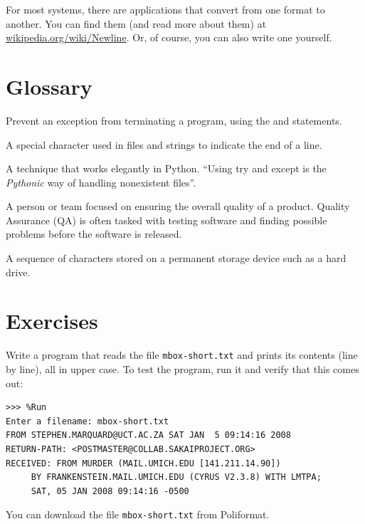 
For most systems, there are applications that convert from one format to another. You can find them (and read more about them) at \url{wikipedia.org/wiki/Newline}. Or, of course, you can also write one yourself.

\hypertarget{glosario}{%
\section{Glossary}\label{glosario}}

\begin{description}
\tightlist
\item[catch]
Prevent an exception from terminating a program, using the  and  statements.

\item[line break]
A special character used in files and strings to indicate the end of a line.

\item[pythonic]
A technique that works elegantly in Python. ``Using try and except is the \emph{Pythonic} way of handling nonexistent files''.

\item[Quality Assurance (QA)]
A person or team focused on ensuring the overall quality of a product. Quality Assurance (QA) is often tasked with testing software and finding possible problems before the software is released.
 

\item[textfile]
A sequence of characters stored on a permanent storage device such as a hard drive.
\end{description}


\section*{Exercises}\label{ejercicios}

\begin{exercise}
Write a program that reads the file \texttt{mbox-short.txt} and prints its contents (line by line), all in upper case. To test the program, run it and verify that this comes out:

\begin{Verbatim}[frame=single]
>>> %Run 
Enter a filename: mbox-short.txt
FROM STEPHEN.MARQUARD@UCT.AC.ZA SAT JAN  5 09:14:16 2008
RETURN-PATH: <POSTMASTER@COLLAB.SAKAIPROJECT.ORG>
RECEIVED: FROM MURDER (MAIL.UMICH.EDU [141.211.14.90])
     BY FRANKENSTEIN.MAIL.UMICH.EDU (CYRUS V2.3.8) WITH LMTPA;
     SAT, 05 JAN 2008 09:14:16 -0500
\end{Verbatim}

You can download the file \texttt{mbox-short.txt} from Poliformat.
\end{exercise}

